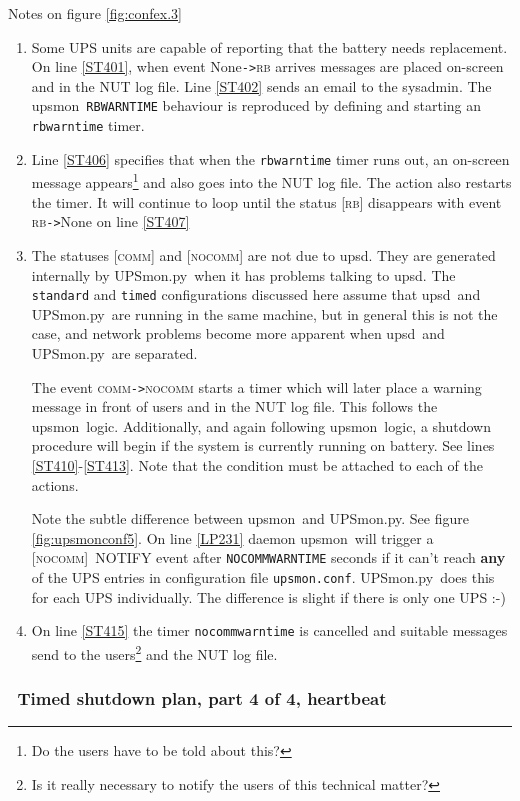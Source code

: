 \documentclass[12pt]{article}
\newlength{\headersep}\setlength{\headersep}{3mm}
\newcommand{\Hsep}{\hspace{\headersep}}
\newcommand{\newcolumn}{\vfill\eject}
\newcommand{\upsd}{\mbox{\textcolor{UPSDCOLOUR}{upsd}}}
\newcommand{\upsmon}{\mbox{\textcolor{MONCOLOUR}{upsmon}}}
\newcommand{\UPSmon}{\mbox{\textcolor{UPSMONCOLOUR}{UPSmon.py}}}
\newcommand{\RB}{\textcolor{UPSDCOLOUR}{\textsc{rb}}}
\newcommand{\NOCOMM}{\textcolor{MONCOLOUR}{\textsc{nocomm}}}
\newcommand{\COMM}{\textcolor{UPSMONCOLOUR}{\textsc{comm}}}
\newcommand{\None}{\textcolor{UPSMONCOLOUR}{\textsf{None}}}
\newcommand{\status}[1]{\textcolor{UPSDCOLOUR}{[{#1}]}}
\newcommand{\NOTev}[1]{\textcolor{MONCOLOUR}{[{#1}]}}
\newcommand{\EVENT}[2]{\textcolor{MONCOLOUR}{#1}{\allowbreak}\texttt{\textcolor{MONCOLOUR}{->}}{\allowbreak}\textcolor{MONCOLOUR}{#2}}
\newcommand{\upsmonconf}{\textcolor{MONCOLOUR}{\texttt{upsmon.conf}}}
\newcommand{\ol}{\begin{enumerate}%
   \setlength{\itemsep}{0em}}
\newcommand{\eol}{\end{enumerate}}
\newcommand{\li}{\item}                 %
\begin{document}
Notes on figure \ref{fig:confex.3}

\ol

\li Some UPS units are capable of reporting that the battery needs
replacement.  On line \ref{ST401}, when event \EVENT{\None}{\RB} arrives
messages are placed on-screen and in the NUT log file.  Line \ref{ST402} sends
an email to the sysadmin.  The \upsmon\ \texttt{RBWARNTIME} behaviour is
reproduced by defining and starting an \texttt{rbwarntime} timer.

\li Line \ref{ST406} specifies that when the \texttt{rbwarntime} timer runs
out, an on-screen message appears\footnote{Do the users have to be told about
  this?} and also goes into the NUT log file.  The action also restarts the
timer.  It will continue to loop until the status \status{\RB} disappears with
event \EVENT{\RB}{\None} on line \ref{ST407}

\li The statuses \status{\COMM} and \status{\NOCOMM} are not due to \upsd.
They are generated internally by \UPSmon\ when it has problems talking to
\upsd.  The \texttt{standard} and \texttt{timed} configurations discussed here
assume that \upsd\ and \UPSmon\ are running in the same machine, but in
general this is not the case, and network problems become more apparent when
\upsd\ and \UPSmon\ are separated.

The event \EVENT{\COMM}{\NOCOMM} starts a timer which will later place a
warning message in front of users and in the NUT log file.  This follows the
\upsmon\ logic.  Additionally, and again following \upsmon\ logic, a shutdown
procedure will begin if the system is currently running on battery.  See lines
\ref{ST410}-\ref{ST413}.  Note that the condition must be attached to each of
the actions.

Note the subtle difference between \upsmon\ and \UPSmon. See figure
\ref{fig:upsmonconf5}.  On line \ref{LP231} daemon \upsmon\ will trigger a
\NOTev{\NOCOMM}\ NOTIFY event after \texttt{NOCOMMWARNTIME} seconds if it
can't reach \textbf{any} of the UPS entries in configuration file \upsmonconf.
\UPSmon\ does this for each UPS individually.  The difference is slight if
there is only one UPS :-)

\li On line \ref{ST415} the timer \texttt{nocommwarntime} is cancelled and
suitable messages send to the users\footnote{Is it really necessary to notify
  the users of this technical matter?} and the NUT log file.

\eol

\newcolumn
\subsubsection{\Hsep\ Timed shutdown plan, part 4 of 4, heartbeat}\label{section:confex.4}
\end{document}
